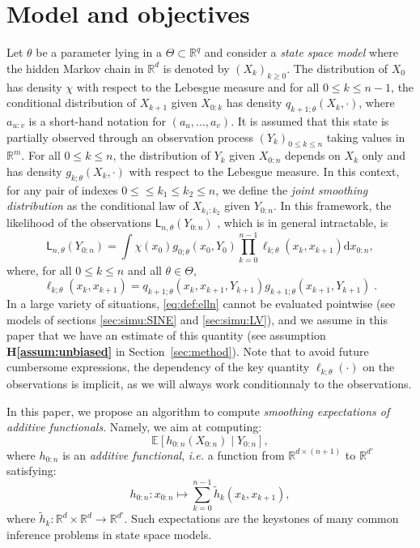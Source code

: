 \documentclass{article}
\newcommand{\md}[1]{g_{#1}}
\newcommand{\llh}[1]{\mathsf{L}_{#1}}
\newcommand{\parvec}{\theta}
\newcommand{\parspace}{\Theta}
\newcommand{\af}[1]{h_{#1}}
\newcommand{\hd}[1]{q_{#1}}
\newcommand{\addf}[1]{\termletter_{#1}}
\newcommand{\termletter}{\tilde{h}}
\def\pE{\mathbb{E}}
\newcommand{\rset}{\ensuremath{\mathbb{R}}}
\newcommand{\rmd}{\ensuremath{\mathrm{d}}}
\newcommand{\eqsp}{\;}
\newcommand{\qg}[1]{\ell_{#1}}
\begin{document}
\section{Model and objectives}
\label{sec:model}

Let $\parvec$ be a parameter lying in a $\Theta\subset \rset^q$ and consider a  \textit{state space model} where the hidden Markov chain  in $\rset^d$ is denoted by $(X_k)_{k\geqslant 0}$. The distribution of $X_0$ has density $\chi$ with respect to the Lebesgue measure and for all $0\leqslant k \leqslant n-1$, the conditional distribution of $X_{k+1} $ given $X_{0:k}$ has density $\hd{k+1;\parvec}(X_{k},\cdot)$, where $a_{u:v}$ is a short-hand notation for $(a_u,\ldots,a_v)$. 
It is assumed that this state  is partially observed  through an observation process $(Y_k)_{0\leqslant k \leqslant n}$ taking values in $\rset^m$. 
For all $0\leqslant k \leqslant n$, the distribution of $Y_k$ given $X_{0:n}$ depends on $X_k$ only and has density $\md{k;\parvec}(X_k,\cdot)$ with respect to the Lebesgue measure. 
In this context, for any pair of indexes $0\leqslant\leqslant k_1 \leqslant k_2 \leqslant n$, we define the \textit{joint smoothing distribution} as the conditional law of $X_{k_1:k_2}$ given $Y_{0:n}$. 
In this framework, the likelihood of the observations $\llh{n,\parvec}(Y_{0:n})$ , which is  in general intractable, is
$$
\llh{n,\parvec}(Y_{0:n})  = \int \chi(x_0)\md{0;\parvec}(x_{0},Y_{0})\prod_{k=0}^{n-1}\qg{k;\parvec}(x_{k},x_{k+1})\rmd x_{0:n},
$$
 where, for all $0\leqslant k \leqslant n$ and all $\parvec\in\parspace$,
\begin{equation}
\label{eq:def:elln}
\qg{k;\parvec}(x_{k},x_{k+1}) = \hd{k+1;\parvec}(x_{k}, x_{k+1}, Y_{k + 1})\md{k+1;\parvec}(x_{k+1},Y_{k+1})\eqsp.
\end{equation}
In a large variety of situations, \eqref{eq:def:elln} cannot be evaluated pointwise  (see models of sections \ref{sec:simu:SINE} and \ref{sec:simu:LV}), and we assume in this paper that we have an estimate of this quantity (see assumption \textbf{H\ref{assum:unbiased}} in Section~\ref{sec:method}).
Note that to avoid future cumbersome expressions, the dependency of the key quantity $\qg{k;\parvec}(\cdot)$ on the observations is implicit, as we will always work conditionnaly to the observations.


In this paper, we propose an algorithm to compute \textit{ smoothing expectations of additive functionals}. 
Namely, we aim at computing: 
$$\pE \left[\af{0:n}(X_{0:n})\middle | Y_{0:n}\right],$$
where $\af{0:n}$ is an \textit{additive functional}, \textit{i.e.} a function from $\rset^{d \times (n + 1)}$ to $\rset^{d'}$ satisfying:
\begin{equation}
\label{eq:additive:functional}
\af{0:n}: x_{0:n} \mapsto \sum_{k=0}^{n-1}\addf{k}(x_{k},x_{k+1}),
\end{equation}
where $\addf{k}:\rset^{d} \times \rset^{d}\to\rset^{d'}$.
Such expectations are the keystones of many common inference problems in state space models.
\end{document}
